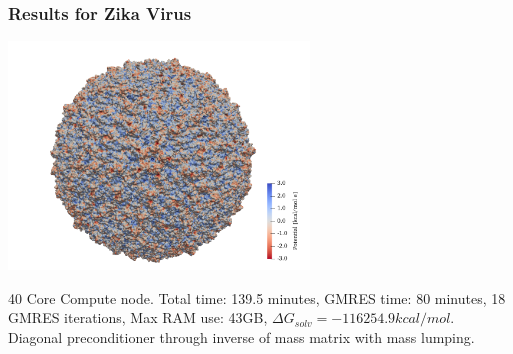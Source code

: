 \documentclass[dvipsnames,10pt]{beamer}
\begin{document}
\begin{frame}
    \frametitle{Results for Zika Virus}

    \begin{center}
        \includegraphics[width=8cm]{../figs/6CO8_potential.png}
    \end{center}

    40 Core Compute node. Total time: 139.5 minutes, GMRES time: 80 minutes, 18 GMRES iterations, Max RAM use: 43GB, $\Delta G_{solv} = -116254.9 kcal/mol$. Diagonal preconditioner through inverse of mass matrix with mass lumping.

\end{frame}
\end{document}
